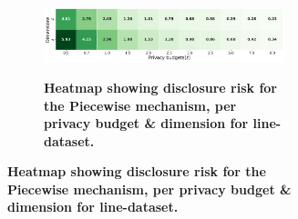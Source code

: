 \begin{figure}
\begin{subfigure}[b]{0.85\textwidth}
        \begin{subfigure}[c]{1\textwidth}
            \caption{\textbf{Heatmap showing disclosure risk for the Piecewise mechanism, per privacy budget \& dimension for line-dataset.}}
            \includegraphics[width=1\textwidth]{Results/kd-laplace/piecewise/line-dataset/distance.png}
            \label{fig:privacy-risk_line-dataset_adversial_advantage_piecewise}
        \end{subfigure}
    \end{subfigure}
    \hfill %
    \begin{subfigure}[b]{0.075\textwidth}

\end{subfigure}
\end{figure}
